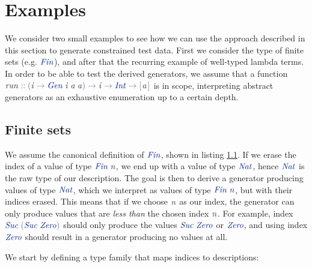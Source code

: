 \documentclass[a4paper,msc,twosized=semi]{uustthesis}
\let\oldemph\emph
\renewcommand\emph[1]{{\large\oldemph{#1}}}
\newcommand*{\mathcolor}{}
\def\mathcolor#1#{\mathcoloraux{#1}}
\newcommand*{\mathcoloraux}[3]{%
  \protect\leavevmode
  \begingroup
    \color#1{#2}#3%
  \endgroup
}
\newcommand{\HSSpecial}[1]{\mathcolor{hsblue4}{#1}}
\newcommand{\HSSym}[1]{\mathcolor{hsblue4}{#1}}
\newcommand{\HSCon}[1]{\mathcolor{hsblue3}{\mathit{#1}}}
\newcommand{\HSVar}[1]{\mathcolor{hsblue5}{\mathit{#1}}}
\begin{document}
\section{Examples}

  We consider two small examples to see how we can use the approach described in this 
  section to generate constrained test data. First we consider the type of finite sets 
  (e.g. \ensuremath{\HSCon{Fin}}), and after that the recurring example of well-typed lambda terms. In 
  order to be able to test the derived generators, we assume that a function \ensuremath{\HSVar{run}\HSSym{::}\HSSpecial{(}\HSVar{i}\HSSym{\to} \HSCon{Gen}\;\HSVar{i}\;\HSVar{a}\;\HSVar{a}\HSSpecial{)}\HSSym{\to} \HSVar{i}\HSSym{\to} \HSCon{Int}\HSSym{\to} \HSSpecial{\HSSym{[\mskip1.5mu} }\HSVar{a}\HSSpecial{\HSSym{\mskip1.5mu]}}} is in scope, interpreting abstract generators 
  as an exhaustive enumeration up to a certain depth. 

\subsection{Finite sets}

  We assume the canonical definition of \ensuremath{\HSCon{Fin}}, shown in listing \ref{}. If we erase the index of 
  a value of type \ensuremath{\HSCon{Fin}\;\HSVar{n}}, we end up with a value of type \ensuremath{\HSCon{Nat}}, hence \ensuremath{\HSCon{Nat}} is the 
  raw type of our description. The goal is then to derive a generator producing values 
  of type \ensuremath{\HSCon{Nat}}, which we interpret as values of type \ensuremath{\HSCon{Fin}\;\HSVar{n}}, but with their indices 
  erased. This means that if we choose \ensuremath{\HSVar{n}} as our index, the generator can only 
  produce values that are \emph{less than} the chosen index \ensuremath{\HSVar{n}}. For example, index \ensuremath{\HSCon{Suc}\;\HSSpecial{(}\HSCon{Suc}\;\HSCon{Zero}\HSSpecial{)}} should only produce the values \ensuremath{\HSCon{Suc}\;\HSCon{Zero}} or \ensuremath{\HSCon{Zero}}, and using index 
  \ensuremath{\HSCon{Zero}} should result in a generator producing no values at all. 

  We start by defining a type family that maps indices to descriptions: 
\end{document}
